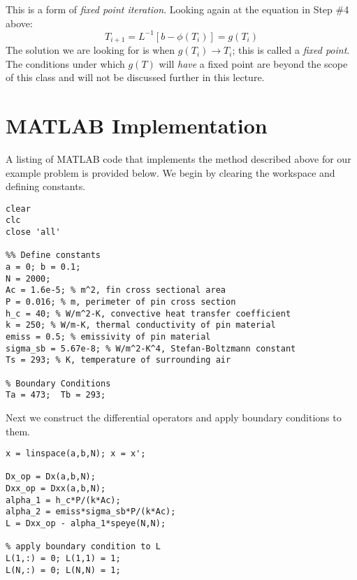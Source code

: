 This is a form of \emph{fixed point iteration}. Looking again at the equation in Step \#4 above:
\begin{equation*}
T_{i+1} = L^{-1}\left[b-\phi(T_{i})\right] = g(T_i)
\end{equation*}
The solution we are looking for is when $g(T_i) \rightarrow T_i$; this is called a \emph{fixed point}.  The conditions under which $g(T)$ will \emph{have} a fixed point are beyond the scope of this class and will not be discussed further in this lecture.

\section{MATLAB Implementation}
A listing of MATLAB code that implements the method described above for our example problem is provided below.  We begin by clearing the workspace and defining constants.
\begin{lstlisting}[style=myMatlab,name=lec32n-ex]
clear
clc
close 'all'

%% Define constants
a = 0; b = 0.1;
N = 2000;
Ac = 1.6e-5; % m^2, fin cross sectional area
P = 0.016; % m, perimeter of pin cross section
h_c = 40; % W/m^2-K, convective heat transfer coefficient 
k = 250; % W/m-K, thermal conductivity of pin material
emiss = 0.5; % emissivity of pin material
sigma_sb = 5.67e-8; % W/m^2-K^4, Stefan-Boltzmann constant
Ts = 293; % K, temperature of surrounding air

% Boundary Conditions
Ta = 473;  Tb = 293;
\end{lstlisting}


\noindent Next we construct the differential operators and apply boundary conditions to them.
\begin{lstlisting}[style=myMatlab,name=lec32n-ex]
% Discretize the space and get Operators
x = linspace(a,b,N); x = x';

Dx_op = Dx(a,b,N);
Dxx_op = Dxx(a,b,N);
alpha_1 = h_c*P/(k*Ac);
alpha_2 = emiss*sigma_sb*P/(k*Ac);
L = Dxx_op - alpha_1*speye(N,N);

% apply boundary condition to L
L(1,:) = 0; L(1,1) = 1; 
L(N,:) = 0; L(N,N) = 1;

\end{lstlisting}

